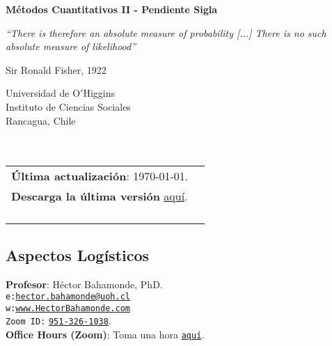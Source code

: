 \documentclass[letterpaper]{article}
\def\name{M\'etodos Cuantitativos II - Pendiente Sigla}
\begin{document}

\centerline{\huge \bf \name}

\epigraph{\emph{``There is therefore an absolute measure of probability [...] There is no such absolute measure of likelihood''}}{Sir Ronald Fisher, 1922}


\vspace{0.25in}

\begin{minipage}{0.45\linewidth}
 Universidad de O$'$Higgins \\
  Instituto de Ciencias Sociales \\
  Rancagua, Chile\\
  \\
  \\

\end{minipage}
\hspace{4cm}\begin{minipage}{0.45\linewidth}
  \begin{tabular}{ll}
{\bf \'Ultima actualizaci\'on}: \today. \\
 {\bf Descarga la \'ultima versi\'on} \href{https://github.com/hbahamonde/MLE/raw/master/Bahamonde_MLE.pdf}{aqu\'i}.%
    \\
    \\
    \\
    \\
    \\
  \end{tabular}
\end{minipage}



\subsection*{Aspectos Log\'isticos}


\vspace{1mm}
{\bf Profesor}: H\'ector Bahamonde, PhD.\\
\texttt{e:}\href{mailto:hector.bahamonde@uoh.cl}{\texttt{hector.bahamonde@uoh.cl}}\\
\texttt{w:}\href{http://www.hectorbahamonde.com}{\texttt{www.HectorBahamonde.com}}\\
\texttt{Zoom ID:} \href{https://us02web.zoom.us/j/9513261038?pwd=S3BSWXQxZW11NC9CRjRoMmd0TkpEZz09}{\texttt{951-326-1038}}.\\
{\bf Office Hours (Zoom)}: Toma una hora \href{https://calendly.com/bahamonde/officehours}{\texttt{aqu\'i}}.
\end{document}
